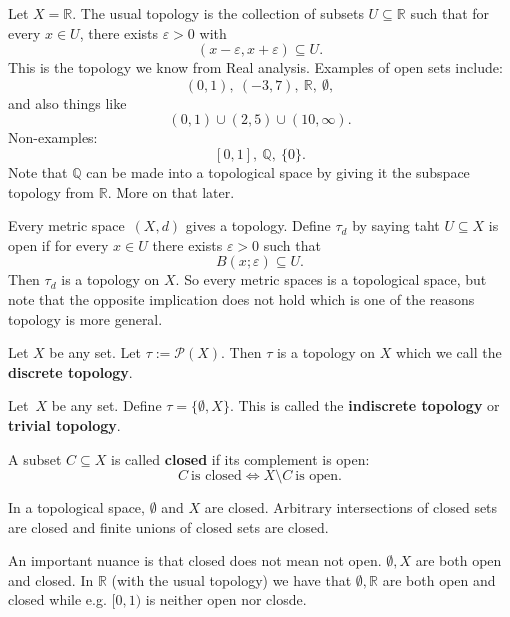\documentclass[11pt]{article}
\begin{document}
\begin{ex}[$\mathbb R$]
    Let $X = \mathbb R$. The usual topology is the 
    collection of subsets $U \subseteq \mathbb R$ such 
    that for every $x \in U$, there exists $\varepsilon > 0$ with 
    \[
        (x - \varepsilon, x + \varepsilon) \subseteq U.
    \]
    This is the topology we know from Real analysis. 
    Examples of open sets include: 
    \[
        (0,1), \ (-3,7), \ \mathbb R, \ \emptyset, 
    \]
    and also things like 
    \[
        (0,1) \cup (2,5)\cup (10, \infty). 
    \]
    Non-examples: 
    \[
        [0,1], \ \mathbb Q, \ \{0\}. 
    \]
    Note that $\mathbb Q$ can be made into a topological space 
    by giving it the subspace topology from $\mathbb R$. 
    More on that later. 
\end{ex}
\begin{ex}
    Every metric space $(X,d)$ gives a topology. 
    Define $\tau_d$ by saying taht $U \subseteq X$ is open 
    if for every $x \in U$ there exists $\varepsilon > 0$ such that 
    \[
        B(x;\varepsilon) \subseteq U.
    \]
    Then $\tau_d$ is a topology on $X$. 
    So every metric spaces is a topological space, but 
    note that the opposite implication does not hold which 
    is one of the reasons topology is more general. 
\end{ex}
\begin{ex}
    Let $X$ be any set. Let $\tau := \mathcal P(X)$. 
    Then $\tau$ is a topology on $X$ which we call 
    the \textbf{discrete topology}. 
\end{ex}
\begin{ex}
    Let $X$ be any set. Define $\tau = \{\emptyset, X\}$. 
    This is called the \textbf{indiscrete topology} or 
    \textbf{trivial topology}.
\end{ex}

\begin{defn}
    A subset $C \subseteq X$ is called \textbf{closed} if its 
    complement is open: 
    \[
        C \ \text{is closed} \Leftrightarrow 
        X \setminus C \ \text{is open}.
    \]
\end{defn}

In a topological space, $\emptyset$ and $X$ are closed. 
Arbitrary intersections of closed sets are closed and 
finite unions of closed sets are closed. 

An important nuance is that closed does not mean not open. 
$\emptyset, X$ are both open and closed. In $\mathbb R$ (with the 
usual topology) we have that
$\emptyset, \mathbb R$ are both open and closed while e.g. 
$[0,1)$ is neither open nor closde. 
\end{document}
